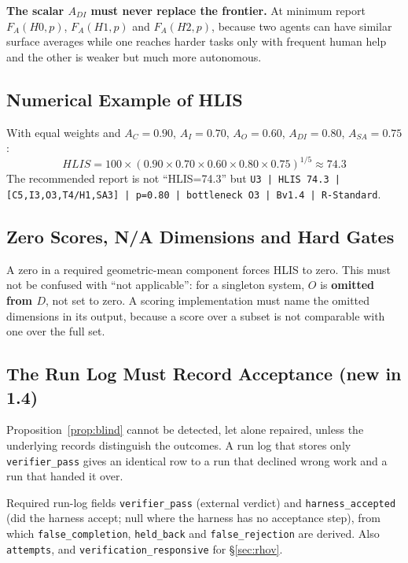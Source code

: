 \documentclass[11pt]{article}
\theoremstyle{definition}
\begin{document}
\textbf{The scalar $A_{DI}$ must never replace the frontier.} At minimum report $F_A(H0,p)$, $F_A(H1,p)$ and $F_A(H2,p)$, because two agents can have similar surface averages while one reaches harder tasks only with frequent human help and the other is weaker but much more autonomous.

\subsection{Numerical Example of HLIS}

With equal weights and $A_C=0.90$, $A_I=0.70$, $A_O=0.60$, $A_{DI}=0.80$, $A_{SA}=0.75$:
\begin{equation*}
HLIS = 100 \times (0.90 \times 0.70 \times 0.60 \times 0.80 \times 0.75)^{1/5} \approx 74.3
\end{equation*}
The recommended report is not ``HLIS=74.3'' but
\texttt{U3 | HLIS 74.3 | [C5,I3,O3,T4/H1,SA3] | p=0.80 | bottleneck O3 | Bv1.4 | R-Standard}.

\subsection{Zero Scores, N/A Dimensions and Hard Gates}

A zero in a required geometric-mean component forces HLIS to zero. This must not be confused with ``not applicable'': for a singleton system, $O$ is \textbf{omitted from $D$}, not set to zero. A scoring implementation must name the omitted dimensions in its output, because a score over a subset is not comparable with one over the full set.

\subsection{The Run Log Must Record Acceptance (new in 1.4)}\label{sec:runlog}

Proposition~\ref{prop:blind} cannot be detected, let alone repaired, unless the underlying records distinguish the outcomes. A run log that stores only \texttt{verifier\_pass} gives an identical row to a run that declined wrong work and a run that handed it over.

\begin{claimbox}{Required run-log fields}
\texttt{verifier\_pass} (external verdict) and \texttt{harness\_accepted} (did the harness accept; null where the harness has no acceptance step), from which \texttt{false\_completion}, \texttt{held\_back} and \texttt{false\_rejection} are derived. Also \texttt{attempts}, and \texttt{verification\_responsive} for \S\ref{sec:rhov}.
\end{claimbox}
\end{document}
